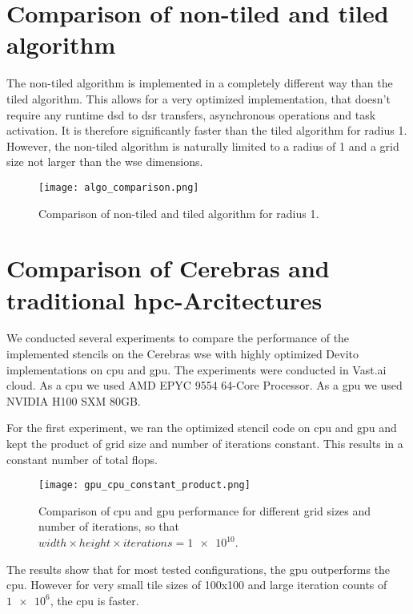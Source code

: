 \section{Comparison of non-tiled and tiled algorithm}

The non-tiled algorithm is implemented in a completely different way than the tiled algorithm.
This allows for a very optimized implementation, that doesn't require any runtime \ac{dsd} to \ac{dsr} transfers, asynchronous operations and task activation.
It is therefore significantly faster than the tiled algorithm for radius 1.
However, the non-tiled algorithm is naturally limited to a radius of 1 and a grid size not larger than the \ac{wse} dimensions.

\begin{figure}[h]
    \centering
    \texttt{[image: algo\_comparison.png]}
    \caption{Comparison of non-tiled and tiled algorithm for radius 1.}
    \label{fig:algo_comparison}
\end{figure}

\section{Comparison of Cerebras and traditional \ac{hpc}-Arcitectures}
We conducted several experiments to compare the performance of the implemented stencils on the Cerebras \ac{wse} with highly optimized Devito implementations on \ac{cpu} and \ac{gpu}. The experiments were conducted in Vast.ai cloud.
As a \ac{cpu} we used AMD EPYC 9554 64-Core Processor.
As a \ac{gpu} we used NVIDIA H100 SXM 80GB.

For the first experiment, we ran the optimized stencil code on \ac{cpu} and \ac{gpu} and kept the product of grid size and number of iterations constant. This results in a constant number of total flops. 

\begin{figure}[h]
    \centering
    \texttt{[image: gpu\_cpu\_constant\_product.png]}
    \caption{Comparison of \ac{cpu} and \ac{gpu} performance for different grid sizes and number of iterations, so that $width \times height \times iterations = \num{1e10}$.}
    \label{fig:gpu_cpu_constant_product}
\end{figure}

The results show that for most tested configurations, the \ac{gpu} outperforms the \ac{cpu}.
However for very small tile sizes of 100x100 and large iteration counts of $\num{1e6}$, the \ac{cpu} is faster.

